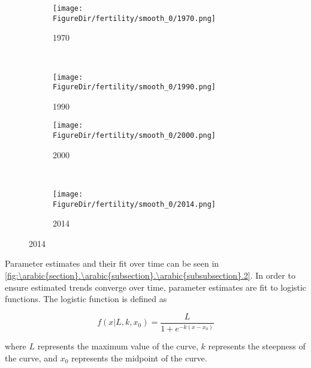 \documentclass[10pt]{article}
\renewcommand{\thesection}{\arabic{section}}
\renewcommand{\thesubsection}{\thesection.\arabic{subsection}}
\renewcommand{\thesubsubsection}{\thesubsection.\arabic{subsubsection}}
\numberwithin{equation}{subsection}
\newcommand*{\FigureDir}{../../graphs}
\begin{document}
\begin{figure}[!ht]
	\centering
   \caption{\label{fig:\thesubsubsection.1}Fertility Estimated by Generalized Beta 2}
		\begin{subfigure}{0.5\textwidth}
			\centering
			\texttt{[image: \\FigureDir/fertility/smooth\_0/1970.png]}
			\caption{1970}
		\end{subfigure}%
		~ %
		\begin{subfigure}{0.5\textwidth}
			\centering
			\texttt{[image: \\FigureDir/fertility/smooth\_0/1990.png]}
			\caption{1990}
		\end{subfigure}%
		\newline
		\begin{subfigure}{0.5\textwidth}
			\centering
			\texttt{[image: \\FigureDir/fertility/smooth\_0/2000.png]}
			\caption{2000}
		\end{subfigure}%
		~ %
		\begin{subfigure}{0.5\textwidth}
			\centering
			\texttt{[image: \\FigureDir/fertility/smooth\_0/2014.png]}
			\caption{2014}
		\end{subfigure}%
\end{figure}

\par Parameter estimates and their fit over time can be seen in \autoref{fig:\thesubsubsection.2}. In order to ensure estimated trends converge over time, parameter estimates are fit to logistic functions. The logistic function is defined as

\begin{equation}\label{eq:logistic_fn}
   f(x|L, k, x_0) = \frac{L}{1 + e^{-k(x-x_0)}}
\end{equation}

\noindent where \(L\) represents the maximum value of the curve, \(k\) represents the steepness of the curve, and \(x_0\) represents the midpoint of the curve.
\end{document}
